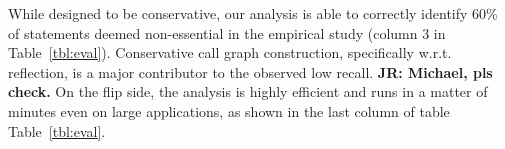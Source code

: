 
%

While designed to be conservative, our analysis is able to correctly identify %
60\% of statements deemed non-essential in the empirical study 
(column 3 in Table~\ref{tbl:eval}). 
Conservative call graph construction, specifically w.r.t. reflection, is a major contributor to the observed low recall. {\bf JR: Michael, pls check.}
On the flip side, the analysis is highly efficient and runs in a matter of minutes even on large applications, as shown in the last column of table Table~\ref{tbl:eval}.



